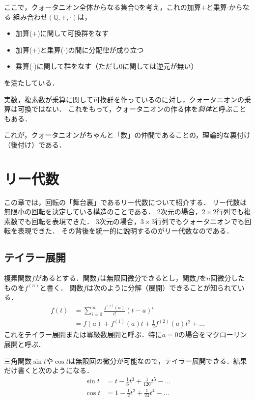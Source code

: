 \documentclass{jsbook}
\newcommand{\keyword}[1]{\emph{#1}}
\begin{document}
ここで，クォータニオン全体からなる集合$\mathbb{Q}$を考え，これの加算$+$と乗算$\cdot$からなる
組み合わせ$(\mathbb{Q},+,\cdot)$は，
\begin{itemize}
\item 加算($+$)に関して可換群をなす
\item 加算($+$)と乗算($\cdot$)の間に分配律が成り立つ
\item 乗算($\cdot$)に関して群をなす（ただし$0$に関しては逆元が無い）
\end{itemize}
を満たしている．

実数，複素数が乗算に関して可換群を作っているのに対し，クォータニオンの乗算は可換ではない．
これをもって，クォータニオンの作る体を\keyword{斜体}と呼ぶこともある．

これが，クォータニオンがちゃんと「数」の仲間であることの，理論的な裏付け（後付け）である．


\chapter{リー代数}

この章では，回転の「舞台裏」であるリー代数について紹介する．
リー代数は無限小の回転を決定している構造のことである．
2次元の場合，$2\times2$行列でも複素数でも回転を表現できた．
3次元の場合，$3\times3$行列でもクォータニオンでも回転を表現できた．
その背後を統一的に説明するのがリー代数なのである．

\section{テイラー展開}

複素関数$f$があるとする．関数$f$は無限回微分できるとし，関数$f$を$n$回微分したものを$f^{(n)}$と書く．
関数$f$は次のように分解（展開）できることが知られている．
\begin{align}
f(t)&=\sum_{i=0}^\infty\frac{f^{(i)}(a)}{i!}(t-a)^i\\
&=f(a)+f^{(1)}(a)t+\frac{1}{2}f^{(2)}(a)t^2+\dots
\end{align}
これをテイラー展開または冪級数展開と呼ぶ．特に$a=0$の場合をマクローリン展開と呼ぶ．

三角関数$\sin t$や$\cos t$は無限回の微分が可能なので，テイラー展開できる．結果だけ書くと次のようになる．
\begin{align}
\sin t&=t-\frac{1}{6}t^3+\frac{1}{120}t^5-\dots\\
\cos t&=1-\frac{1}{2}t^2+\frac{1}{24}t^4-\dots
\end{align}
\end{document}
